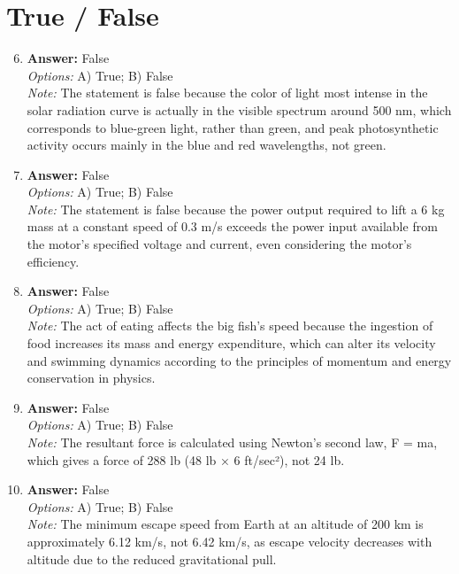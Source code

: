 \documentclass[12pt]{article}
\begin{document}
\section*{True / False}
\begin{enumerate}[label=\arabic*.]
\setcounter{enumi}{5}
\item \textbf{Answer:} False
\\ \textit{Options:} A) True; B) False
\\ \textit{Note:} The statement is false because the color of light most intense in the solar radiation curve is actually in the visible spectrum around 500 nm, which corresponds to blue-green light, rather than green, and peak photosynthetic activity occurs mainly in the blue and red wavelengths, not green.
\item \textbf{Answer:} False
\\ \textit{Options:} A) True; B) False
\\ \textit{Note:} The statement is false because the power output required to lift a 6 kg mass at a constant speed of 0.3 m/s exceeds the power input available from the motor's specified voltage and current, even considering the motor's efficiency.
\item \textbf{Answer:} False
\\ \textit{Options:} A) True; B) False
\\ \textit{Note:} The act of eating affects the big fish's speed because the ingestion of food increases its mass and energy expenditure, which can alter its velocity and swimming dynamics according to the principles of momentum and energy conservation in physics.
\item \textbf{Answer:} False
\\ \textit{Options:} A) True; B) False
\\ \textit{Note:} The resultant force is calculated using Newton's second law, F = ma, which gives a force of 288 lb (48 lb × 6 ft/sec²), not 24 lb.
\item \textbf{Answer:} False
\\ \textit{Options:} A) True; B) False
\\ \textit{Note:} The minimum escape speed from Earth at an altitude of 200 km is approximately 6.12 km/s, not 6.42 km/s, as escape velocity decreases with altitude due to the reduced gravitational pull.
\end{enumerate}
\end{document}
